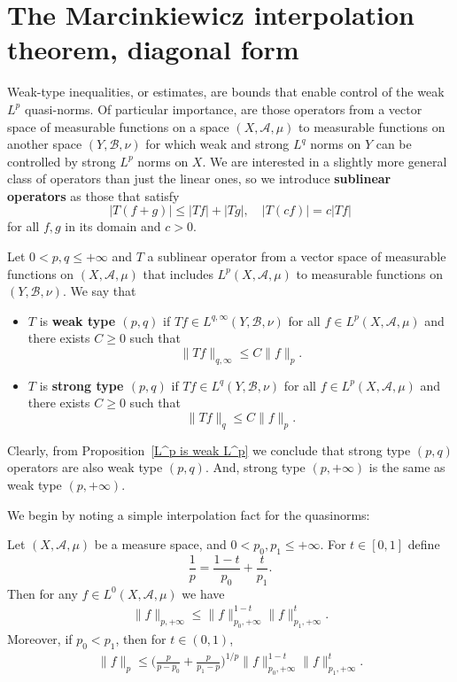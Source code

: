 \section{The Marcinkiewicz interpolation theorem, diagonal form}
Weak-type inequalities, or estimates, are bounds that enable control of the weak $L^p$ quasi-norms. Of particular importance, are those operators from a vector space of measurable functions on a space $(X,\mathcal{A},\mu)$ to measurable functions on another space $(Y,\mathcal{B},\nu)$ for which weak and strong $L^q$ norms on $Y$ can be controlled by strong $L^p$ norms on $X$. We are interested in a slightly more general class of operators than just the linear ones, so we introduce \textbf{sublinear operators} as those that satisfy
\[|T(f+g)|\leq|Tf|+|Tg|,\quad |T(cf)|=c|Tf|\]
for all $f,g$ in its domain and $c>0$.
\begin{definition}
Let $0<p,q\leq +\infty$ and $T$ a sublinear operator from a vector space of measurable functions on $(X,\mathcal{A},\mu)$ that includes $L^p(X,\mathcal{A},\mu)$ to measurable functions on $(Y,\mathcal{B},\nu)$. We say that
\begin{itemize}
\item $T$ is \textbf{weak type $(p,q)$} if $Tf\in L^{q,\infty}(Y,\mathcal{B},\nu)$ for all $f\in L^p(X,\mathcal{A},\mu)$ and there exists $C\geq 0$ such that
\[\|Tf\|_{q,\infty}\leq C\|f\|_{p}.\]
\item $T$ is \textbf{strong type $(p,q)$} if $Tf\in L^{q}(Y,\mathcal{B},\nu)$ for all $f\in L^p(X,\mathcal{A},\mu)$ and there exists $C\geq 0$ such that
\[\|Tf\|_{q}\leq C\|f\|_{p}.\]
\end{itemize}
Clearly, from Proposition~\ref{L^p is weak L^p} we conclude that strong type $(p,q)$ operators are also weak type $(p,q)$. And, strong type $(p,+\infty)$ is the same as weak type $(p,+\infty)$.
\end{definition}
We begin by noting a simple interpolation fact for the quasinorms:
\begin{proposition}\label{interpolation for weak norms}
Let $(X,\mathcal{A},\mu)$ be a measure space, and $0<p_0,p_1\leq+\infty$. For $t\in[0,1]$ define
\[\frac{1}{p}=\frac{1-t}{p_0}+\frac{t}{p_1}.\]
Then for any $f\in L^0(X,\mathcal{A},\mu)$ we have
\begin{align}\label{interpolation for weak norms-1}
\|f\|_{p,+\infty}\leq\|f\|_{p_0,+\infty}^{1-t}\|f\|_{p_1,+\infty}^t.
\end{align}
Moreover, if $p_0<p_1$, then for $t\in(0,1)$,
\begin{align}\label{interpolation for weak norms-2}
\|f\|_{p}\leq\Big(\frac{p}{p-p_0}+\frac{p}{p_1-p}\Big)^{1/p}\|f\|_{p_0,+\infty}^{1-t}\|f\|_{p_1,+\infty}^t.
\end{align}
\end{proposition}

